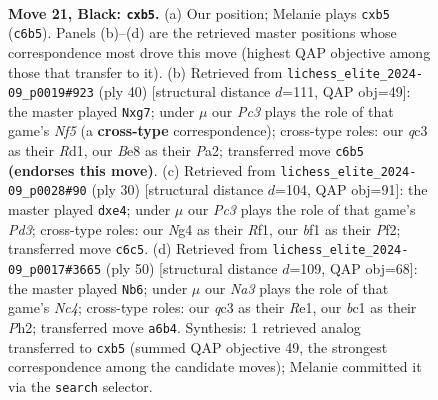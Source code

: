 \documentclass[11pt]{article}
\begin{document}
\clearpage

\begin{figure}[p]\centering
\begin{subfigure}{0.46\textwidth}\centering
\resizebox{\linewidth}{!}{%
\newchessgame
\chessboard[
  setfen={2r1b1k1/p1qr1pp1/n1p1p3/1P5p/3P1Pn1/1PQ3P1/1N2P2P/R1B1RBK1 b - - 0 21},
  showmover=false,
  pgfstyle=straightmove, color=movearrow, markmove={c6-b5}
]}
\caption{}
\end{subfigure}\hfill
\begin{subfigure}{0.46\textwidth}\centering
\resizebox{\linewidth}{!}{%
\newchessgame
\chessboard[
  setfen={r2qbrk1/1p3pb1/4p2p/3nNNp1/p6B/2P2Q1P/PP3PP1/3RR1K1 w - - 0 21},
  showmover=false,
  pgfstyle=straightmove, color=movearrow, markmove={f5-g7}
]}
\caption{}
\end{subfigure}
\\[4pt]
\begin{subfigure}{0.46\textwidth}\centering
\resizebox{\linewidth}{!}{%
\newchessgame
\chessboard[
  setfen={r1b1k2r/pp2q1b1/2p1n2p/2P2p2/4p3/P1NPBN1P/2P2PP1/R3QRK1 w kq - 0 16},
  showmover=false,
  pgfstyle=straightmove, color=movearrow, markmove={d3-e4}
]}
\caption{}
\end{subfigure}\hfill
\begin{subfigure}{0.46\textwidth}\centering
\resizebox{\linewidth}{!}{%
\newchessgame
\chessboard[
  setfen={r2r1bk1/1b2qp2/p2p2pp/1p1Pp3/P1N5/2RQ2PB/1PP2P1P/4R1K1 w - - 0 26},
  showmover=false,
  pgfstyle=straightmove, color=movearrow, markmove={c4-b6}
]}
\caption{}
\end{subfigure}
\caption{\textbf{Move 21, Black: \texttt{cxb5}.} (a) Our position; Melanie plays \texttt{cxb5} (\texttt{c6b5}). Panels (b)--(d) are the retrieved master positions whose correspondence most drove this move (highest QAP objective among those that transfer to it). (b) Retrieved from \texttt{lichess\_elite\_2024-09\_p0019\#923} (ply 40) [structural distance $d$=111, QAP obj=49]: the master played \texttt{Nxg7}; under $\mu$ our \emph{Pc3} plays the role of that game's \emph{Nf5} (a \textbf{cross-type} correspondence); cross-type roles: our \emph{q}c3 as their \emph{R}d1, our \emph{B}e8 as their \emph{P}a2; transferred move \texttt{c6b5} \textbf{(endorses this move)}. (c) Retrieved from \texttt{lichess\_elite\_2024-09\_p0028\#90} (ply 30) [structural distance $d$=104, QAP obj=91]: the master played \texttt{dxe4}; under $\mu$ our \emph{Pc3} plays the role of that game's \emph{Pd3}; cross-type roles: our \emph{N}g4 as their \emph{R}f1, our \emph{b}f1 as their \emph{P}f2; transferred move \texttt{c6c5}. (d) Retrieved from \texttt{lichess\_elite\_2024-09\_p0017\#3665} (ply 50) [structural distance $d$=109, QAP obj=68]: the master played \texttt{Nb6}; under $\mu$ our \emph{Na3} plays the role of that game's \emph{Nc4}; cross-type roles: our \emph{q}c3 as their \emph{R}e1, our \emph{b}c1 as their \emph{P}h2; transferred move \texttt{a6b4}. Synthesis: 1 retrieved analog transferred to \texttt{cxb5} (summed QAP objective 49, the strongest correspondence among the candidate moves); Melanie committed it via the \texttt{search} selector.}
\label{fig:thought-m41}
\end{figure}
\end{document}
